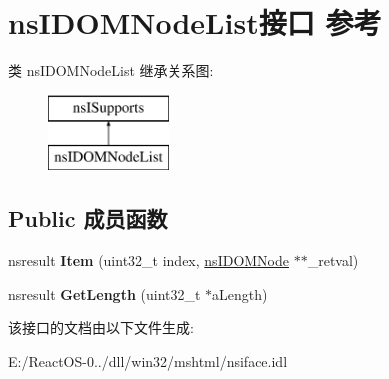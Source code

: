 \hypertarget{interfacens_i_d_o_m_node_list}{}\section{ns\+I\+D\+O\+M\+Node\+List接口 参考}
\label{interfacens_i_d_o_m_node_list}
类 ns\+I\+D\+O\+M\+Node\+List 继承关系图\+:\begin{figure}[H]
\begin{center}
\leavevmode
\includegraphics[height=2.000000cm]{interfacens_i_d_o_m_node_list}
\end{center}
\end{figure}
\subsection*{Public 成员函数}
\begin{DoxyCompactItemize}
\item 
\mbox{\label{interfacens_i_d_o_m_node_list_ab3a6a0d62700dcbe0a4653e4f5ba6e5b}} 
nsresult {\bfseries Item} (uint32\+\_\+t index, \hyperlink{interfacens_i_d_o_m_node}{ns\+I\+D\+O\+M\+Node} $\ast$$\ast$\+\_\+retval)
\item 
\mbox{\label{interfacens_i_d_o_m_node_list_a670f2fa8e230767eb44c5b242811eee8}} 
nsresult {\bfseries Get\+Length} (uint32\+\_\+t $\ast$a\+Length)
\end{DoxyCompactItemize}


该接口的文档由以下文件生成\+:\begin{DoxyCompactItemize}
\item 
E\+:/\+React\+O\+S-\/0../dll/win32/mshtml/nsiface.\+idl\end{DoxyCompactItemize}
